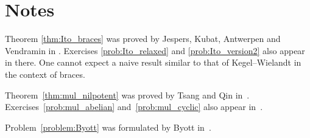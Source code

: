 \section*{Notes}

Theorem \ref{thm:Ito_braces} was proved by Jespers, Kubat, Antwerpen and Vendramin in \cite{MR4023387}. 
Exercises \ref{prob:Ito_relaxed} 
and \ref{prob:Ito_version2} 
also appear in there. 
One cannot expect a naive result similar to
that of Kegel--Wielandt in the context of braces. 

Theorem~\ref{thm:mul_nilpotent} was proved by Tsang and Qin in~\cite{MR4077413}. 
Exercises~\ref{prob:mul_abelian} and~\ref{prob:mul_cyclic} also appear in~\cite{MR4077413}.

Problem~\ref{problem:Byott} was formulated by Byott in~\cite{MR3425626}.